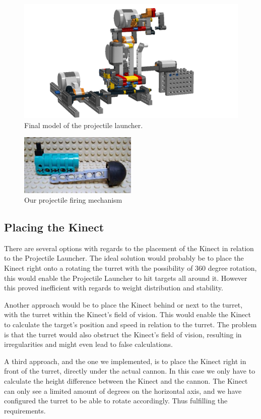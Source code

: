 \begin{figure}[hptb]
  \centering
    \includegraphics[width=1.0\textwidth]{img/design_turret3.png}
  \caption{Final model of the projectile launcher.}
  \label{final_model}
\end{figure}

\begin{figure}[hptb]
  \centering
    \includegraphics[width=0.5\textwidth]{img/competition_cannon.jpg}
  \caption{Our projectile firing mechanism}
  \label{competition_cannon}
\end{figure}

\subsection{Placing the Kinect} %
\label{sub:placing_the_kinect}
There are several options with regards to the placement of the Kinect in relation to the Projectile Launcher. The ideal solution would probably be to place the Kinect right onto a rotating the turret with the possibility of 360 degree rotation, this would enable the Projectile Launcher to hit targets all around it. However this proved inefficient with regards to weight distribution and stability.

Another approach would be to place the Kinect behind or next to the turret, with the turret within the Kinect's field of vision. This would enable the Kinect to calculate the target's position and speed in relation to the turret. The problem is that the turret would also obstruct the Kinect's field of vision, resulting in irregularities and might even lead to false calculations.

A third approach, and the one we implemented, is to place the Kinect right in front of the turret, directly under the actual cannon. In this case we only have to calculate the height difference between the Kinect and the cannon. The Kinect can only see a limited amount of degrees on the horizontal axis, and we have configured the turret to be able to rotate accordingly. Thus fulfilling the requirements.
